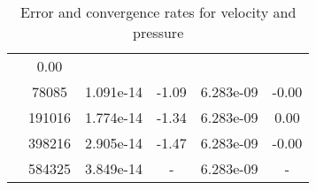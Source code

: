 \begin{table}
\begin{center}
{\begin{tabular}{| l | c | c | c | c | c |}
                &0.00\\
                
            &78085
            
                &1.091e-14
                
                &-1.09
                
                &6.283e-09
                
                &-0.00\\
                
            &191016
            
                &1.774e-14
                
                &-1.34
                
                &6.283e-09
                
                &0.00\\
                
            &398216
            
                &2.905e-14
                
                &-1.47
                
                &6.283e-09
                
                &-0.00\\
                
            &584325
            
                &3.849e-14
                
                &-
                
                &6.283e-09
                
                &-\\
                \hline\end{tabular}}
    \end{center}
    \caption{Error and convergence rates for velocity and pressure}
    \label{tab:conv}
    \end{table}
